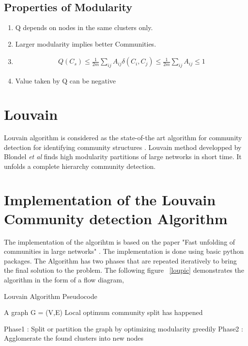 \subsection{Properties of Modularity}
\begin{enumerate}
 \item Q depends on nodes in the same clusters only. 
  \item Larger modularity implies better Communities.
    \item 
    \begin{equation}
    \begin{split}
Q(C_s) \leq \frac{1}{2m} \sum_{ij} A_{ij} \delta(C_i,C_j) \leq \frac{1}{2m} \sum_{ij} A_{ij} \leq 1
\end{split}
    \end{equation}
 \item Value taken by Q can be negative
 \end{enumerate}
 
 \section{Louvain}
 Louvain algorithm is considered as the state-of-the art algorithm for community detection for identifying community structures \cite{louvain}. Louvain method developped by Blondel \textit{et al} \cite{louvain} finds high modularity partitions of large networks in short time. It unfolds a complete hierarchy community detection. 
 


\section{Implementation of the Louvain Community detection Algorithm}

The implementation  of the algorihtm is based on the paper "Fast unfolding of communities in large networks" \cite{louvain}.  The implementation is done using basic python packages. 
 The Algorithm has two phases that are repeated iteratively to bring the final solution to the problem. The following figure ~\ref{loupic} demonstrates the algorithm in the form of a flow diagram,
 
\begin{algorithm}[H]
\caption{Louvain Algorithm Pseudocode}
\begin{algorithmic} 
\REQUIRE A graph G = (V,E)
\ENSURE Local optimum community split has happened

\STATE Phase1 : Split or partition the graph by optimizing modularity greedily
\STATE Phase2 : Agglomerate the found clusters into new nodes
\ENDWHILE
\end{algorithmic}
\end{algorithm}


